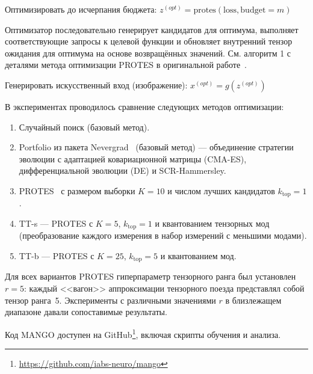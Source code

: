 \begin{algorithm}[H]
\caption{Построение НАИ с использованием PROTES}\label{alg:mango}
\footnotesize
{}


Оптимизировать до исчерпания бюджета:
$
z^{(opt)} =
    \mathrm{protes}(\mathrm{loss}, \mathrm{budget}=m)
$

Оптимизатор последовательно генерирует кандидатов для оптимума, выполняет соответствующие запросы к целевой функции и обновляет внутренний тензор ожидания для оптимума на основе возвращённых значений. См. алгоритм 1 с деталями метода оптимизации PROTES в оригинальной работе~\cite{PROTES-Chertkov-paper}.

Генерировать искусственный вход (изображение):
$
x^{(opt)} = g(z^{(opt)})
$


\end{algorithm}

В экспериментах проводилось сравнение следующих методов оптимизации:
\begin{enumerate}
    \itemsep0em
    \item Случайный поиск (базовый метод).
    \item Portfolio из пакета Nevergrad~\cite{Nevergrad} (базовый метод) --- объединение стратегии эволюции с адаптацией ковариационной матрицы (CMA-ES), дифференциальной эволюции (DE) и SCR-Hammersley.
    \item PROTES~\cite{PROTES-Chertkov-paper} с размером выборки $K=10$ и числом лучших кандидатов $k_\mathrm{top}=1$.
    \item TT-s --- PROTES с $K=5$, $k_\mathrm{top}=1$ и квантованием тензорных мод (преобразование каждого измерения в набор измерений с меньшими модами).
    \item TT-b --- PROTES с $K=25$, $k_\mathrm{top}=5$ и квантованием мод.
\end{enumerate}
Для всех вариантов PROTES гиперпараметр тензорного ранга был установлен $r = 5$: каждый <<вагон>> аппроксимации тензорного поезда представлял собой тензор ранга~5. Эксперименты с различными значениями $r$ в близлежащем диапазоне давали сопоставимые результаты.

Код MANGO доступен на GitHub\footnote{\url{https://github.com/iabs-neuro/mango}}, включая скрипты обучения и анализа.
